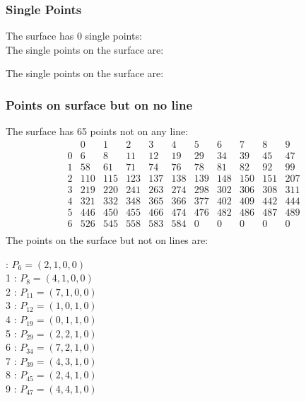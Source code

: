 \documentclass{article}
\begin{document}
{\subsubsection*{Single Points}
The surface has 0 single points:\\
The single points on the surface are:\\
\begin{multicols}{2}
\noindent
\end{multicols}
The single points on the surface are:\\
\subsubsection*{Points on surface but on no line}
The surface has 65 points not on any line:\\
$$
\begin{array}{r|*{10}{r}}
 & 0 & 1 & 2 & 3 & 4 & 5 & 6 & 7 & 8 & 9\\
\hline
0 & 6 & 8 & 11 & 12 & 19 & 29 & 34 & 39 & 45 & 47\\
1 & 58 & 61 & 71 & 74 & 76 & 78 & 81 & 82 & 92 & 99\\
2 & 110 & 115 & 123 & 137 & 138 & 139 & 148 & 150 & 151 & 207\\
3 & 219 & 220 & 241 & 263 & 274 & 298 & 302 & 306 & 308 & 311\\
4 & 321 & 332 & 348 & 365 & 366 & 377 & 402 & 409 & 442 & 444\\
5 & 446 & 450 & 455 & 466 & 474 & 476 & 482 & 486 & 487 & 489\\
6 & 526 & 545 & 558 & 583 & 584 & 0 & 0 & 0 & 0 & 0\\
\end{array}
$$
The points on the surface but not on lines are:\\
\begin{multicols}{2}
 : $P_{6}=( 2, 1, 0, 0 )$\\
1 : $P_{8}=( 4, 1, 0, 0 )$\\
2 : $P_{11}=( 7, 1, 0, 0 )$\\
3 : $P_{12}=( 1, 0, 1, 0 )$\\
4 : $P_{19}=( 0, 1, 1, 0 )$\\
5 : $P_{29}=( 2, 2, 1, 0 )$\\
6 : $P_{34}=( 7, 2, 1, 0 )$\\
7 : $P_{39}=( 4, 3, 1, 0 )$\\
8 : $P_{45}=( 2, 4, 1, 0 )$\\
9 : $P_{47}=( 4, 4, 1, 0 )$\\

\end{multicols}}
\end{document}

